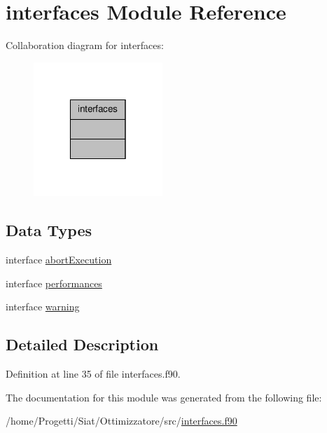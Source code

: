 \hypertarget{classinterfaces}{\section{interfaces Module Reference}
\label{classinterfaces}
}


Collaboration diagram for interfaces\-:\nopagebreak
\begin{figure}[H]
\begin{center}
\leavevmode
\includegraphics[width=138pt]{classinterfaces__coll__graph}
\end{center}
\end{figure}
\subsection*{Data Types}
\begin{DoxyCompactItemize}
\item 
interface \hyperlink{interfaceinterfaces_1_1abort_execution}{abort\-Execution}
\item 
interface \hyperlink{interfaceinterfaces_1_1performances}{performances}
\item 
interface \hyperlink{interfaceinterfaces_1_1warning}{warning}
\end{DoxyCompactItemize}


\subsection{Detailed Description}


Definition at line 35 of file interfaces.\-f90.



The documentation for this module was generated from the following file\-:\begin{DoxyCompactItemize}
\item 
/home/\-Progetti/\-Siat/\-Ottimizzatore/src/\hyperlink{interfaces_8f90}{interfaces.\-f90}\end{DoxyCompactItemize}
